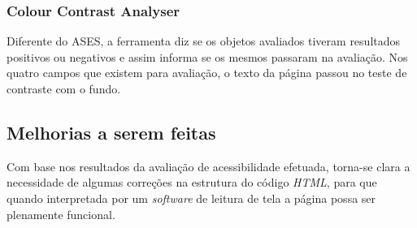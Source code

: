     \subsubsection{Colour Contrast Analyser}
    
    Diferente do ASES, a ferramenta diz se os objetos avaliados
    tiveram resultados positivos ou negativos e assim informa se os mesmos passaram na 
    avaliação. Nos quatro campos que existem para avaliação, o texto da página passou no teste 
    de contraste com o fundo.
    
    \subsection{Melhorias a serem feitas}
    
    Com base nos resultados da avaliação de acessibilidade efetuada, torna-se clara a
    necessidade de algumas correções na estrutura do código \textit{HTML},  para que quando 
    interpretada por um \textit{software} de leitura de tela a página possa ser plenamente funcional.